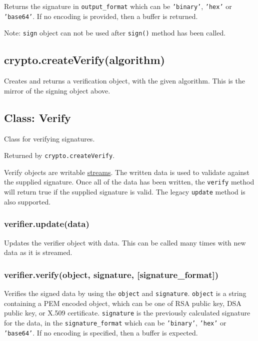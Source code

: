 Returns the signature in \texttt{output\_format} which can be
\texttt{'binary'}, \texttt{'hex'} or \texttt{'base64'}. If no encoding
is provided, then a buffer is returned.

Note: \texttt{sign} object can not be used after \texttt{sign()} method
has been called.

\subsection{crypto.createVerify(algorithm)}\label{crypto.createverifyalgorithm}

Creates and returns a verification object, with the given algorithm.
This is the mirror of the signing object above.

\subsection{Class: Verify}\label{class-verify}

Class for verifying signatures.

Returned by \texttt{crypto.createVerify}.

Verify objects are writable \href{stream.html}{streams}. The written
data is used to validate against the supplied signature. Once all of the
data has been written, the \texttt{verify} method will return true if
the supplied signature is valid. The legacy \texttt{update} method is
also supported.

\subsubsection{verifier.update(data)}\label{verifier.updatedata}

Updates the verifier object with data. This can be called many times
with new data as it is streamed.

\subsubsection{verifier.verify(object, signature,
{[}signature\_format{]})}\label{verifier.verifyobject-signature-signatureux5fformat}

Verifies the signed data by using the \texttt{object} and
\texttt{signature}. \texttt{object} is a string containing a PEM encoded
object, which can be one of RSA public key, DSA public key, or X.509
certificate. \texttt{signature} is the previously calculated signature
for the data, in the \texttt{signature\_format} which can be
\texttt{'binary'}, \texttt{'hex'} or \texttt{'base64'}. If no encoding
is specified, then a buffer is expected.

